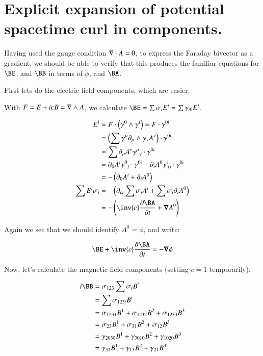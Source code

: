 \section{Explicit expansion of potential spacetime curl in components. }

Having used the gauge condition $\nabla \cdot A = 0$, to express the Faraday bivector as a gradient, we should be able to
verify that this produces the familiar equations for $\BE$, and $\BB$ in terms of $\phi$, and $\BA$.

First lets do the electric field components, which are easier.

With $F = E + icB = \nabla \wedge A$, we calculate $\BE = \sum \sigma_i E^i = \sum \gamma_{i0} E^i$.

\begin{align*}
E^i
&= F \cdot \left(\gamma^{0} \wedge \gamma^{i}\right) = F \cdot \gamma^{0i} \\
&= \left(\sum \gamma^{\mu} \partial_{\mu} \wedge \gamma_{\nu} A^{\nu} \right) \cdot \gamma^{0i} \\
&= \sum \partial_{\mu} A^{\nu} {\gamma^{\mu}}_{\nu} \cdot \gamma^{0i} \\
&= \partial_{0} A^{i} {\gamma^{0}}_{i} \cdot \gamma^{0i} + \partial_{i} A^{0} {\gamma^{i}}_{0} \cdot \gamma^{0i} \\
&= - \left(\partial_{0} A^{i} + \partial_{i} A^{0} \right) \\
\sum E^i \sigma_i
&= - \left(\partial_{ct} \sum \sigma_i A^{i} + \sum \sigma_i \partial_{i} A^{0} \right) \\
&= - \left( \inv{c} \frac{\partial \BA}{\partial t} + \spacegrad A^{0} \right) \\
\end{align*}

Again we see that we should identify $A^0 = \phi$, and write:

\begin{equation}
\BE + \inv{c} \frac{\partial \BA}{\partial t} = -\spacegrad \phi
\end{equation}

Now, let's calculate the magnetic field components (setting $c=1$ temporarily):

\begin{align*}
i \BB
&= \sigma_{123} \sum \sigma_i B^i \\
&= \sum \sigma_{123i} B^i \\
&= \sigma_{1231} B^1 + \sigma_{1232} B^2 + \sigma_{1233} B^3 \\
&= \sigma_{23} B^1 + \sigma_{31} B^2 + \sigma_{12} B^3 \\
&= \gamma_{2030} B^1 + \gamma_{3010} B^2 + \gamma_{1020} B^3 \\
&= \gamma_{32} B^1 + \gamma_{13} B^2 + \gamma_{21} B^3 \\
\end{align*}


